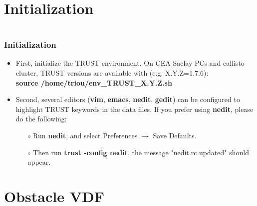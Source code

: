 \documentclass[10pt, hyperref={unicode=true,pdfusetitle, bookmarks=true,bookmarksnumbered=false,bookmarksopen=false, breaklinks=false,pdfborder={0 0 1},backref=true,colorlinks=true,linkcolor=darkblue,pageanchor}]{beamer}
\begin{document}
\section{{\bf{Initialization}}}
\begin{frame}
\begin{columns}[c] 
\tableofcontents[sections={1-9},currentsection, currentsubsection]
\tableofcontents[sections={10-16},currentsection, currentsubsection]
\end{columns}
\end{frame}
\begin{frame}
\frametitle{Initialization}
\begin{block}{}

\begin{itemize}
\item First, initialize the TRUST environment. On CEA Saclay PCs and callisto cluster, TRUST versions are available with (e.g. X.Y.Z=1.7.6):\\
\vspace{0.2cm}
\textbf{source  /home/triou/env\_TRUST\_X.Y.Z.sh}
\vspace{0.5cm}

\item Second, several editors (\textbf{vim}, \textbf{emacs}, \textbf{nedit}, \textbf{gedit}) can be configured to highlight TRUST keywords in the data files. If you prefer using \textbf{nedit}, please do the following:

    \begin{itemize}
    \item [$\circ$] Run \textbf{nedit}, and select Preferences $\rightarrow$ Save Defaults.
    \item [$\circ$] Then run \textbf{trust -config nedit}, the message "nedit.rc updated" should appear.
    \end{itemize}
\end{itemize}

\end{block}
\end{frame}



\section{{\bf{Obstacle VDF}}} \label{exo1}
\end{document}

